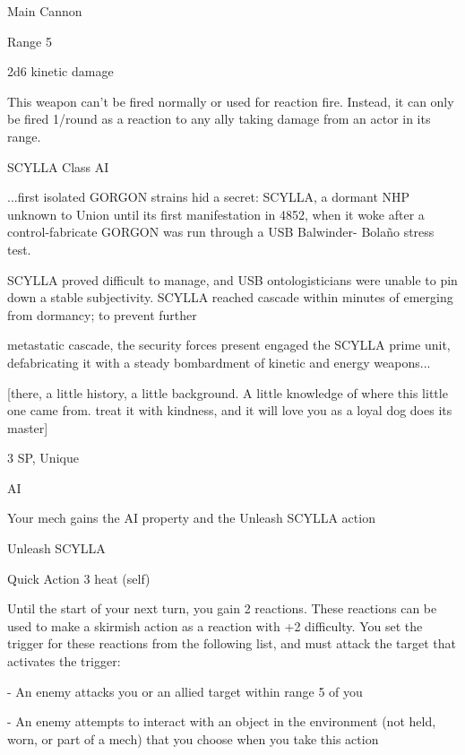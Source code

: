 Main Cannon

Range 5

2d6 kinetic damage

This weapon can’t be fired normally or used for reaction fire. Instead, it can only be fired 1/round
as a reaction to any ally taking damage from an actor in its range.

SCYLLA Class AI

...first isolated GORGON strains hid a secret: SCYLLA, a dormant NHP unknown to Union until its first
manifestation in 4852, when it woke after a control-fabricate GORGON was run through a USB Balwinder-
Bolaño stress test.

SCYLLA proved difficult to manage, and USB ontologisticians were unable to pin down a stable
subjectivity. SCYLLA reached cascade within minutes of emerging from dormancy; to prevent further

metastatic cascade, the security forces present engaged the SCYLLA prime unit, defabricating it with a
steady bombardment of kinetic and energy weapons...

[there, a little history, a little background. A little knowledge of where this little one came from. treat it with
kindness, and it will love you as a loyal dog does its master]

3 SP, Unique

AI

Your mech gains the AI property and the Unleash SCYLLA action

         Unleash SCYLLA

         Quick Action
  	      3 heat (self)

         Until the start of your next turn, you gain 2 reactions. These reactions can be used to
         make a skirmish action as a reaction with +2 difficulty. You set the trigger for these
         reactions from the following list, and must attack the target that activates the trigger:

              -   An enemy attacks you or an allied target within range 5 of you

              -   An enemy attempts to interact with an object in the environment (not held, worn,
                  or part of a mech) that you choose when you take this action
